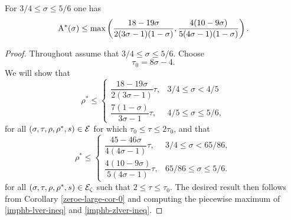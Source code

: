 \begin{theorem}\label{imp-hb-energy-bound}
For $3/4 \le \sigma \le 5/6$ one has 
\[
\mathrm{A}^*(\sigma) \le \max\left(\frac{18 - 19\sigma}{2(3\sigma - 1)(1-\sigma)}, \frac{4(10 - 9\sigma)}{5(4\sigma - 1)(1 - \sigma)}\right).
\]
\end{theorem}

\derived 
{}

\begin{proof}
Throughout assume that $3/4 \le \sigma \le 5/6$. Choose 
\[
\tau_0 = 8\sigma - 4.
\]
We will show that
\begin{equation}\label{imphb-lver-ineq}
\rho^* \le \begin{cases}
\dfrac{18 - 19\sigma}{2(3\sigma - 1)}\tau,&3/4 \le \sigma < 4/5\\
\dfrac{7(1 - \sigma)}{3\sigma - 1}\tau,&4/5 \le \sigma \le 5/6,
\end{cases} 
\end{equation}
for all $(\sigma, \tau, \rho, \rho^*, s) \in \mathcal{E}$ for which $\tau_0 \le \tau \le 2\tau_0$, and that
\begin{equation}\label{imphb-zlver-ineq}
\rho^* \le \begin{cases}
\dfrac{45 - 46\sigma}{4(4\sigma - 1)}\tau,&3/4 \le \sigma < 65/86,\\
\dfrac{4(10 - 9\sigma)}{5(4\sigma - 1)}\tau,&65/86 \le \sigma \le 5/6.
\end{cases}
\end{equation}
for all $(\sigma, \tau, \rho, \rho^*, s) \in \mathcal{E}_\zeta$ such that $2 \le \tau \le \tau_0$. The desired result then follows from Corollary \ref{zeroe-large-cor-0} and computing the piecewise maximum of \eqref{imphb-lver-ineq} and \eqref{imphb-zlver-ineq}. 


\end{proof}
